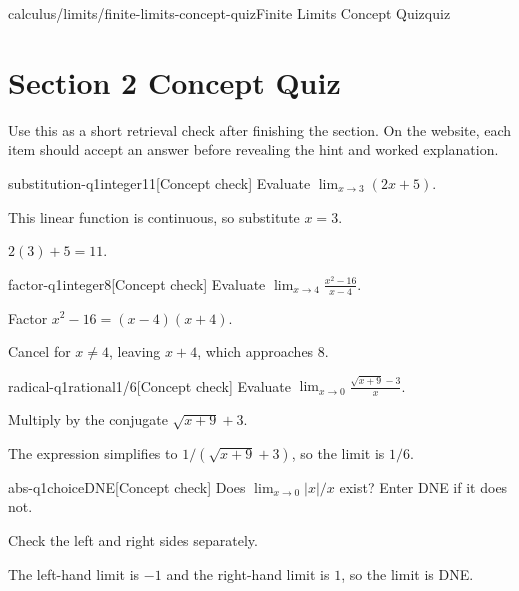 \documentclass[11pt,openany]{book}
\theoremstyle{bgplain}
\newcounter{bgcheck}[section]
\begin{document}
\begin{webpage}{calculus/limits/finite-limits-concept-quiz}{Finite Limits Concept Quiz}{quiz}
\section*{Section 2 Concept Quiz}

Use this as a short retrieval check after finishing the section. On the website, each item should accept an answer before revealing the hint and worked explanation.

\begin{bgcheck}{substitution-q1}{integer}{11}[Concept check]
Evaluate \(\lim_{x\to3}(2x+5)\).
\begin{bghint}
This linear function is continuous, so substitute \(x=3\).
\end{bghint}
\begin{bgreveal}
\(2(3)+5=11\).
\end{bgreveal}
\end{bgcheck}

\begin{bgcheck}{factor-q1}{integer}{8}[Concept check]
Evaluate \(\lim_{x\to4}\frac{x^2-16}{x-4}\).
\begin{bghint}
Factor \(x^2-16=(x-4)(x+4)\).
\end{bghint}
\begin{bgreveal}
Cancel for \(x\ne4\), leaving \(x+4\), which approaches \(8\).
\end{bgreveal}
\end{bgcheck}

\begin{bgcheck}{radical-q1}{rational}{1/6}[Concept check]
Evaluate \(\lim_{x\to0}\frac{\sqrt{x+9}-3}{x}\).
\begin{bghint}
Multiply by the conjugate \(\sqrt{x+9}+3\).
\end{bghint}
\begin{bgreveal}
The expression simplifies to \(1/(\sqrt{x+9}+3)\), so the limit is \(1/6\).
\end{bgreveal}
\end{bgcheck}

\begin{bgcheck}{abs-q1}{choice}{DNE}[Concept check]
Does \(\lim_{x\to0}|x|/x\) exist? Enter DNE if it does not.
\begin{bghint}
Check the left and right sides separately.
\end{bghint}
\begin{bgreveal}
The left-hand limit is \(-1\) and the right-hand limit is \(1\), so the limit is DNE.
\end{bgreveal}
\end{bgcheck}


\end{webpage}
\end{document}
